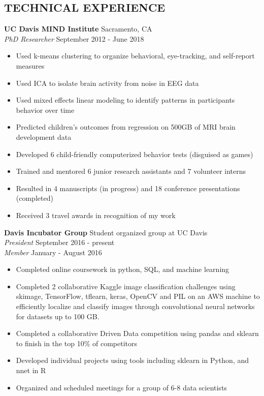 \documentclass[line,margin,10pt]{res}
\begin{document}
\begin{resume}
\section{TECHNICAL EXPERIENCE}
\textbf{UC Davis MIND Institute} \hfill Sacramento, CA \\
{\sl PhD Researcher} \hfill September 2012 - June 2018
\begin{itemize} \itemsep -2pt
\item Used k-means clustering to organize behavioral, eye-tracking, and self-report measures
\item Used ICA to isolate brain activity from noise in EEG data
\item Used mixed effects linear modeling to identify patterns in participants behavior over time
\item Predicted children's outcomes from regression on 500GB of MRI brain development data
\item Developed 6 child-friendly computerized behavior tests (disguised as games)
\item Trained and mentored 6 junior research assistants and 7 volunteer interns
\item Resulted in 4 manuscripts (in progress) and 18 conference presentations (completed)
\item Received 3 travel awards in recognition of my work
\end{itemize}

\textbf{Davis Incubator Group} \hfill Student organized group at UC Davis\\
{\sl President} \hfill September 2016 - present\\
{\sl Member} \hfill January - August 2016 
\begin{itemize} \itemsep -2pt
\item Completed online coursework in python, SQL, and machine learning
\item Completed 2 collaborative Kaggle image classification challenges using skimage, TensorFlow, tflearn, keras, OpenCV and PIL on an AWS machine to efficiently localize and classify images through convolutional neural networks for datasets up to 100 GB.
\item Completed a collaborative Driven Data competition using pandas and sklearn to finish in the top 10\% of competitors
\item Developed individual projects using tools including sklearn in Python, and nnet in R
\item Organized and scheduled meetings for a group of 6-8 data scientists %
\end{itemize}


\end{resume}
\end{document}

